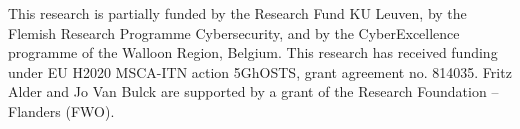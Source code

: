 \documentclass[sigplan,10pt]{acmart}
\begin{document}
\begin{acks}
This research is partially funded by the Research Fund KU Leuven, by the
Flemish Research Programme Cybersecurity, and by the CyberExcellence
programme of the Walloon Region, Belgium. This research has received funding
under EU H2020 MSCA-ITN action 5GhOSTS, grant agreement no. 814035. Fritz Alder
and Jo Van Bulck are supported by a grant of the Research Foundation -- Flanders
(FWO).
\end{acks}





\end{document}
